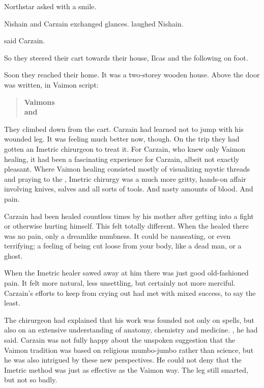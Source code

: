  Northstar asked with a smile. 

Nishain and Carzain exchanged glances. 
 laughed Nishain. 

 said Carzain. 

So they steered their cart towards their house, 
Ilcas and the \nycans{} following on foot. 

Soon they reached their home. 
It was a two-storey wooden house. 
Above the door was written, in Vaimon script: 

\begin{quote}
\begin{center}
{\bf 
Vaimons \\
\Shireyo{} and \Deracille{}
}
\end{center}
\end{quote}

They climbed down from the cart. 
Carzain had learned not to jump with his wounded leg. 
It was feeling much better now, though. 
On the trip they had gotten an Imetric chirurgeon to treat it. 
For Carzain, who knew only Vaimon healing, it had been a fascinating experience for Carzain, albeit not exactly pleasant. 
Where Vaimon healing consisted mostly of visualizing mystic threads and praying to the \sephiroth, Imetric chirurgy was a much more gritty, hands-on affair involving knives, salves and all sorts of tools. 
And nasty amounts of blood. 
And pain. 

Carzain had been healed countless times by his mother after getting into a fight or otherwise hurting himself. 
This felt totally different. 
When the \sephirah{} \Ishiel{} healed there was no pain, only a dreamlike numbness. 
It could be nauseating, or even terrifying; a feeling of being cut loose from your body, like a dead man, or a ghost. 

When the Imetric healer sawed away at him there was just good old-fashioned pain. 
It felt more natural, less unsettling, but certainly not more merciful. 
Carzain's efforts to keep from crying out had met with mixed success, to say the least. 

The chirurgeon had explained that his work was founded not only on spells, but also on an extensive understanding of anatomy, chemistry and medicine. 
, he had said. 
Carzain was not fully happy about the unspoken suggestion that the Vaimon tradition was based on religious mumbo-jumbo rather than science, but he was also intrigued by these new perspectives. 
He could not deny that the Imetric method was just as effective as the Vaimon way. 
The leg still smarted, but not so badly. 

